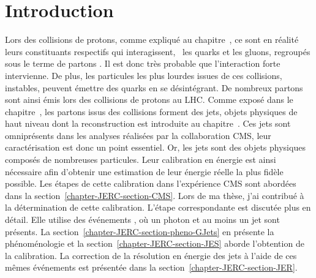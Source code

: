 \section{Introduction}\label{chapter-JERC-section-introduction}
Lors des collisions de protons, comme expliqué au chapitre~,
ce sont en réalité leurs constituants respectifs qui interagissent,
\ie\ les quarks et les gluons, regroupés sous le terme de \og partons \fg.
Il est donc très probable que l'interaction forte intervienne.
De plus, les particules les plus lourdes issues de ces collisions, instables, peuvent émettre des quarks en se désintégrant.
De nombreux partons sont ainsi émis lors des collisions de protons au LHC.
Comme exposé dans le chapitre~, les partons issus des collisions forment des jets, objets physiques de haut niveau dont la reconstruction est introduite au chapitre~.
Ces jets sont omniprésents dans les analyses réalisées par la collaboration CMS,
leur caractérisation est donc un point essentiel.
Or, les jets sont des objets physiques composés de nombreuses particules.
Leur calibration en énergie est ainsi nécessaire afin d'obtenir une estimation de leur énergie réelle la plus fidèle possible.
Les étapes de cette calibration dans l'expérience CMS sont abordées dans la section~\ref{chapter-JERC-section-CMS}.
Lors de ma thèse, j'ai contribué à la détermination de cette calibration.
L'étape correspondante est discutée plus en détail.
Elle utilise des événements \Gjets, où un photon et au moins un jet sont présents.
La section~\ref{chapter-JERC-section-pheno-GJets} en présente la phénoménologie
et
la section~\ref{chapter-JERC-section-JES} aborde l'obtention de la calibration.
La correction de la résolution en énergie des jets à l'aide de ces mêmes événements est présentée dans la section~\ref{chapter-JERC-section-JER}.